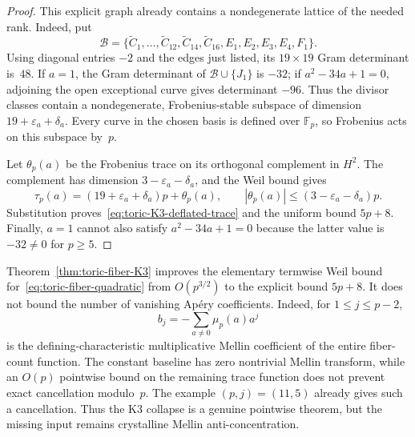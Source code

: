 \begin{proof}
This explicit graph already contains a nondegenerate lattice of the needed
rank.  Indeed, put
\[
 \mathcal B=\{\widetilde C_1,\ldots,\widetilde C_{12},
 \widetilde C_{14},\widetilde C_{16},E_1,E_2,E_3,E_4,F_1\}.
\]
Using diagonal entries $-2$ and the edges just listed, its $19\times19$
Gram determinant is~$48$.  If $a=1$, the Gram determinant of
$\mathcal B\cup\{J_1\}$ is $-32$; if
$a^2-34a+1=0$, adjoining the open exceptional curve gives determinant
$-96$.  Thus the divisor classes contain a nondegenerate, Frobenius-stable
subspace of dimension $19+\varepsilon_a+\delta_a$.  Every curve in the
chosen basis is defined over $\mathbb F_p$, so Frobenius acts on this
subspace by~$p$.

Let $\theta_p(a)$ be the Frobenius trace on its orthogonal complement in
$H^2$.  The complement has dimension $3-\varepsilon_a-\delta_a$, and the
Weil bound gives
\[
 \tau_p(a)=(19+\varepsilon_a+\delta_a)p+\theta_p(a),
 \qquad
 |\theta_p(a)|\leq(3-\varepsilon_a-\delta_a)p.
\]
Substitution proves~\eqref{eq:toric-K3-deflated-trace} and the uniform bound
$5p+8$.  Finally, $a=1$ cannot also satisfy
$a^2-34a+1=0$ because the latter value is $-32\ne0$ for $p\geq5$.
\end{proof}

\begin{remark}
\label{rem:toric-K3-Mellin-limit}
Theorem~\ref{thm:toric-fiber-K3} improves the elementary termwise Weil
bound for~\eqref{eq:toric-fiber-quadratic} from $O(p^{3/2})$ to the explicit
bound $5p+8$.
It does not bound the number of vanishing Ap\'ery coefficients.  Indeed,
for $1\leq j\leq p-2$,
\[
 b_j=-\sum_{a\ne0}\mu_p(a)a^j
\]
is the defining-characteristic multiplicative Mellin coefficient of the
entire fiber-count function.  The constant baseline has zero nontrivial
Mellin transform, while an $O(p)$ pointwise bound on the remaining trace
function does not prevent exact cancellation modulo~$p$.  The example
$(p,j)=(11,5)$ already gives such a cancellation.  Thus the K3 collapse is
a genuine pointwise theorem, but the missing input remains crystalline
Mellin anti-concentration.
\end{remark}
